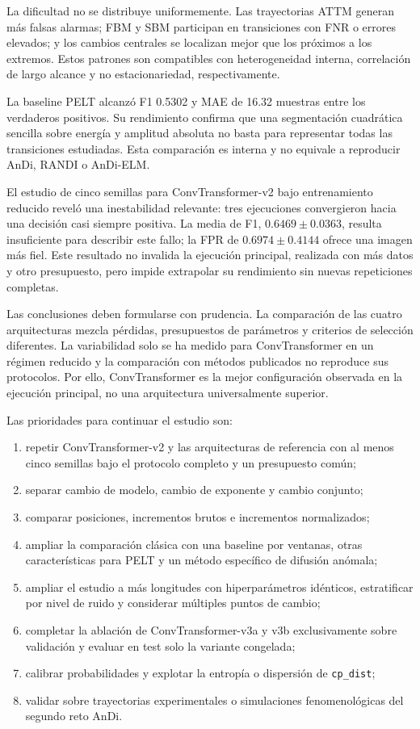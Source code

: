 \documentclass[a4paper,12pt]{article}
\begin{document}
La dificultad no se distribuye uniformemente. Las trayectorias ATTM generan más falsas alarmas; FBM y SBM participan en transiciones con FNR o errores elevados; y los cambios centrales se localizan mejor que los próximos a los extremos. Estos patrones son compatibles con heterogeneidad interna, correlación de largo alcance y no estacionariedad, respectivamente.

La baseline PELT alcanzó F1 0.5302 y MAE de 16.32 muestras entre los verdaderos positivos. Su rendimiento confirma que una segmentación cuadrática sencilla sobre energía y amplitud absoluta no basta para representar todas las transiciones estudiadas. Esta comparación es interna y no equivale a reproducir AnDi, RANDI o AnDi-ELM.

El estudio de cinco semillas para ConvTransformer-v2 bajo entrenamiento reducido reveló una inestabilidad relevante: tres ejecuciones convergieron hacia una decisión casi siempre positiva. La media de F1, $0.6469 \pm 0.0363$, resulta insuficiente para describir este fallo; la FPR de $0.6974 \pm 0.4144$ ofrece una imagen más fiel. Este resultado no invalida la ejecución principal, realizada con más datos y otro presupuesto, pero impide extrapolar su rendimiento sin nuevas repeticiones completas.

Las conclusiones deben formularse con prudencia. La comparación de las cuatro arquitecturas mezcla pérdidas, presupuestos de parámetros y criterios de selección diferentes. La variabilidad solo se ha medido para ConvTransformer en un régimen reducido y la comparación con métodos publicados no reproduce sus protocolos. Por ello, ConvTransformer es la mejor configuración observada en la ejecución principal, no una arquitectura universalmente superior.

Las prioridades para continuar el estudio son:
\begin{enumerate}
  \item repetir ConvTransformer-v2 y las arquitecturas de referencia con al menos cinco semillas bajo el protocolo completo y un presupuesto común;
  \item separar cambio de modelo, cambio de exponente y cambio conjunto;
  \item comparar posiciones, incrementos brutos e incrementos normalizados;
  \item ampliar la comparación clásica con una baseline por ventanas, otras características para PELT y un método específico de difusión anómala;
  \item ampliar el estudio a más longitudes con hiperparámetros idénticos, estratificar por nivel de ruido y considerar múltiples puntos de cambio;
  \item completar la ablación de ConvTransformer-v3a y v3b exclusivamente sobre validación y evaluar en test solo la variante congelada;
  \item calibrar probabilidades y explotar la entropía o dispersión de \texttt{cp\_dist};
  \item validar sobre trayectorias experimentales o simulaciones fenomenológicas del segundo reto AnDi.
\end{enumerate}
\end{document}
